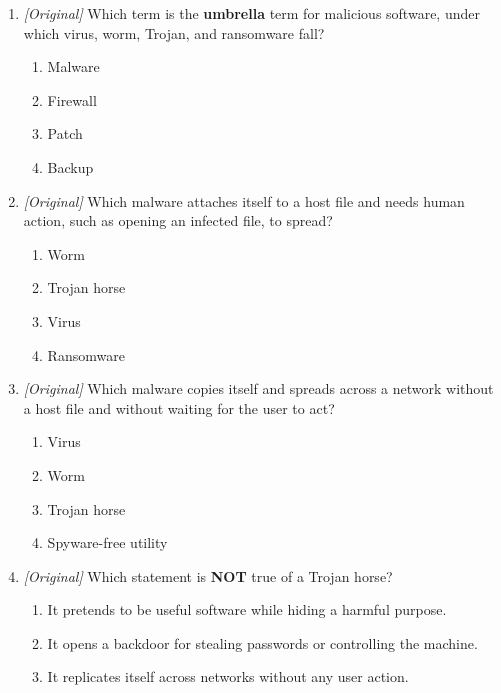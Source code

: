 \begin{enumerate}[label=\textbf{Q\arabic*.}, leftmargin=*]
\begin{enumerate}[label=\Alph*.]
    \item Legal validity of electronic records and electronic signatures
    \item Electronic governance
    \item Cyber contraventions and offences
    \item Regulation of printer hardware prices and typing-test fees
  \end{enumerate}
\item \textit{[Original]} Which term is the \textbf{umbrella} term for
  malicious software, under which virus, worm, Trojan, and ransomware fall?
  \begin{enumerate}[label=\Alph*.]
    \item Malware
    \item Firewall
    \item Patch
    \item Backup
  \end{enumerate}
\item \textit{[Original]} Which malware attaches itself to a host file and
  needs human action, such as opening an infected file, to spread?
  \begin{enumerate}[label=\Alph*.]
    \item Worm
    \item Trojan horse
    \item Virus
    \item Ransomware
  \end{enumerate}
\item \textit{[Original]} Which malware copies itself and spreads across a
  network without a host file and without waiting for the user to act?
  \begin{enumerate}[label=\Alph*.]
    \item Virus
    \item Worm
    \item Trojan horse
    \item Spyware-free utility
  \end{enumerate}
\item \textit{[Original]} Which statement is \textbf{NOT} true of a Trojan
  horse?
  \begin{enumerate}[label=\Alph*.]
    \item It pretends to be useful software while hiding a harmful purpose.
    \item It opens a backdoor for stealing passwords or controlling the machine.
    \item It replicates itself across networks without any user action.

\end{enumerate}
\end{enumerate}
